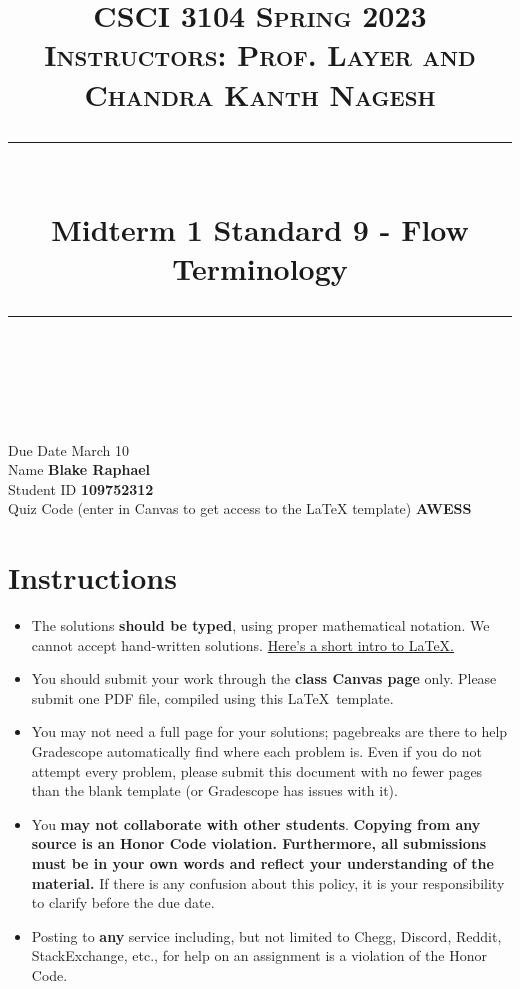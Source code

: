 \documentclass[11pt]{article}
\title{
\normalfont \normalsize 
\textsc{CSCI 3104 Spring 2023 \\
Instructors: Prof. Layer and Chandra Kanth Nagesh} \\
[10pt] 
\rule{\linewidth}{0.5pt} \\[6pt] 
\huge Midterm 1 Standard 9 - Flow Terminology \\
\rule{\linewidth}{2pt}  \\[10pt]
}
\date{}
\theoremstyle{definition}
\theoremstyle{definition}
\theoremstyle{definition}
\begin{document}
\maketitle


\noindent
Due Date \dotfill March 10 \\
Name \dotfill \textbf{Blake Raphael} \\
Student ID \dotfill \textbf{109752312} \\
Quiz Code (enter in Canvas to get access to the LaTeX template) \dotfill \textbf{AWESS} \\

\tableofcontents

\section{Instructions}
 \begin{itemize}
	\item The solutions \textbf{should be typed}, using proper mathematical notation. We cannot accept hand-written solutions. \href{http://ece.uprm.edu/~caceros/latex/introduction.pdf}{Here's a short intro to \LaTeX.}
	\item You should submit your work through the \textbf{class Canvas page} only. Please submit one PDF file, compiled using this \LaTeX \ template.
	\item You may not need a full page for your solutions; pagebreaks are there to help Gradescope automatically find where each problem is. Even if you do not attempt every problem, please submit this document with no fewer pages than the blank template (or Gradescope has issues with it).

	\item You \textbf{may not collaborate with other students}. \textbf{Copying from any source is an Honor Code violation. Furthermore, all submissions must be in your own words and reflect your understanding of the material.} If there is any confusion about this policy, it is your responsibility to clarify before the due date. 

	\item Posting to \textbf{any} service including, but not limited to Chegg, Discord, Reddit, StackExchange, etc., for help on an assignment is a violation of the Honor Code.

	\end{itemize}
\end{document}
